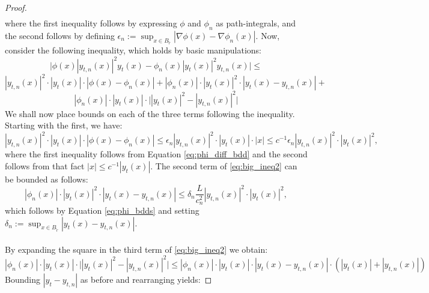 \documentclass[11pt]{article}
\newcommand{\1}{\mathbf{1}}
\theoremstyle{definition}
\theoremstyle{remark}
\begin{document}
\begin{proof}
\begin{equation}
\begin{split}
    \end{split}
    \end{equation}
    where the first inequality follows by expressing $\phi$ and $\phi_n$ as path-integrals, and the second follows by defining $\epsilon_{n}:=\sup_{x\in B_{\tilde{r}}}|\nabla\phi(x)-\nabla \phi_n(x)|$. Now, consider the following inequality, which holds by basic manipulations:
    \begin{equation}\nonumber
            \bigg|\phi(x)|y_{t,n}(x)|^2 y_t(x)-\phi_n(x)|y_t(x)|^2 y_{t,n}(x)\bigg| \leq 
    \end{equation}
    \begin{equation}\nonumber
            |y_{t,n}(x)|^2 \cdot|y_t(x)| \cdot|\phi(x)-\phi_n(x)| + |\phi_n(x)|\cdot |y_t(x)|^2 \cdot |y_t(x)-y_{t,n}(x)| +
    \end{equation}
    \begin{equation}\label{eq:big_ineq2}
            |\phi_n(x)|\cdot |y_t(x)| \cdot \bigg| |y_t(x)|^2-|y_{t,n}(x)|^2\bigg| 
    \end{equation}
    We shall now place bounds on each of the three terms following the inequality. Starting with the first, we have:
    \begin{equation}\nonumber
        |y_{t,n}(x)|^2 \cdot|y_t(x)| \cdot|\phi(x)-\phi_n(x)| \leq \epsilon_{n}|y_{t,n}(x)|^2 \cdot|y_t(x)| \cdot |x| \leq c^{-1}\epsilon_{n}|y_{t,n}(x)|^2 \cdot|y_t(x)|^2,
    \end{equation}
    where the first inequality follows from Equation \eqref{eq:phi_diff_bdd} and the second follows from that fact $|x|\leq c^{-1}|y_t(x)|$. The second term of \eqref{eq:big_ineq2} can be bounded as follows:
    \begin{equation}\nonumber
        |\phi_n(x)|\cdot |y_t(x)|^2 \cdot |y_t(x)-y_{t,n}(x)| \leq \delta_n\frac{L}{c_n^2}|y_{t,n}(x)|^2\cdot |y_t(x)|^2,
    \end{equation}
    which follows by Equation \eqref{eq:phi_bdds} and setting $\delta_n:= \sup_{x\in B_{\tilde{r}}}|y_t(x)-y_{t,n}(x)|$.\\
    \\
    By expanding the square in the third term of \eqref{eq:big_ineq2} we obtain:
    \begin{equation}\nonumber
        |\phi_n(x)|\cdot |y_t(x)| \cdot \bigg| |y_t(x)|^2-|y_{t,n}(x)|^2\bigg| \leq |\phi_n(x)|\cdot |y_t(x)| \cdot | y_t(x)-y_{t,n}(x)|\cdot (|y_t(x)|+|y_{t,n}(x)|) 
    \end{equation}
    Bounding $|y_t-y_{t,n}|$ as before and rearranging yields:

\end{proof}
\end{document}
